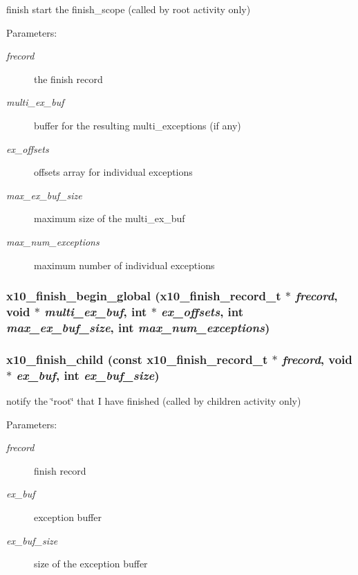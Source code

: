 finish start the finish\_\-scope (called by root activity only) 

\begin{Desc}
\item[Parameters:]
\begin{description}
\item[{\em frecord}]the finish record \item[{\em multi\_\-ex\_\-buf}]buffer for the resulting multi\_\-exceptions (if any) \item[{\em ex\_\-offsets}]offsets array for individual exceptions \item[{\em max\_\-ex\_\-buf\_\-size}]maximum size of the multi\_\-ex\_\-buf \item[{\em max\_\-num\_\-exceptions}]maximum number of individual exceptions \end{description}
\end{Desc}
\subsubsection{ x10\_\-finish\_\-begin\_\-global ({\bf x10\_\-finish\_\-record\_\-t} $\ast$ {\em frecord}, void $\ast$ {\em multi\_\-ex\_\-buf}, int $\ast$ {\em ex\_\-offsets}, int {\em max\_\-ex\_\-buf\_\-size}, int {\em max\_\-num\_\-exceptions})}\label{finish_8cc_a15}


\subsubsection{ x10\_\-finish\_\-child (const {\bf x10\_\-finish\_\-record\_\-t} $\ast$ {\em frecord}, void $\ast$ {\em ex\_\-buf}, int {\em ex\_\-buf\_\-size})}\label{finish_8cc_a13}


notify the \char`\"{}root\char`\"{} that I have finished (called by children activity only) 

\begin{Desc}
\item[Parameters:]
\begin{description}
\item[{\em frecord}]finish record \item[{\em ex\_\-buf}]exception buffer \item[{\em ex\_\-buf\_\-size}]size of the exception buffer \end{description}
\end{Desc}
